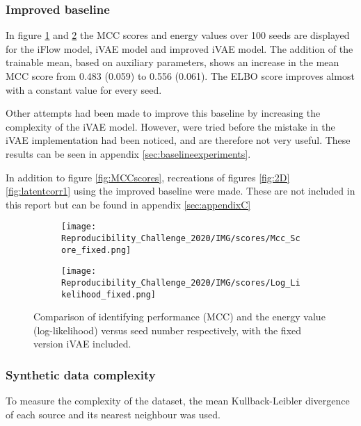 \subsubsection{Improved baseline}
\label{sec:alt methods}
In figure \ref{fig:MCCscores_Fixed:a} and \ref{fig:MCCscores_Fixed:b} the MCC scores and energy values over 100 seeds are displayed for the iFlow model, iVAE model and improved iVAE model. The addition of the trainable mean, based on auxiliary parameters, shows an increase in the mean MCC score from 0.483 (0.059) to 0.556 (0.061). The ELBO score improves almost with a constant value for every seed.

Other attempts had been made to improve this baseline by increasing the complexity of the iVAE model. However, were tried before the mistake in the iVAE implementation had been noticed, and are therefore not very useful. These results can be seen in appendix \ref{sec:baselineexperiments}.

In addition to figure \ref{fig:MCCscores}, recreations of figures \ref{fig:2D} \ref{fig:latentcorr1} using the improved baseline were made. These are not included in this report but can be found in appendix \ref{sec:appendixC}

\begin{figure}[htb]
  \begin{subfigure}[b]{0.5\textwidth}
    \centering
    \texttt{[image: Reproducibility\_Challenge\_2020/IMG/scores/Mcc\_Score\_fixed.png]}
    \caption{}
    \label{fig:MCCscores_Fixed:a}
  \end{subfigure}%
  \begin{subfigure}[b]{0.5\textwidth}
    \centering
    \texttt{[image: Reproducibility\_Challenge\_2020/IMG/scores/Log\_Likelihood\_fixed.png]}
    \caption{}
    \label{fig:MCCscores_Fixed:b}
  \end{subfigure}
  \caption{Comparison of identifying performance (MCC) and the energy value (log-likelihood) versus seed number respectively, with the fixed version iVAE included.}
  \label{fig:MCCscores_Fixed}
\end{figure}

\subsubsection{Synthetic data complexity}
To measure the complexity of the dataset, the mean Kullback-Leibler divergence \cite{kullback1951information} of each source and its nearest neighbour was used.

